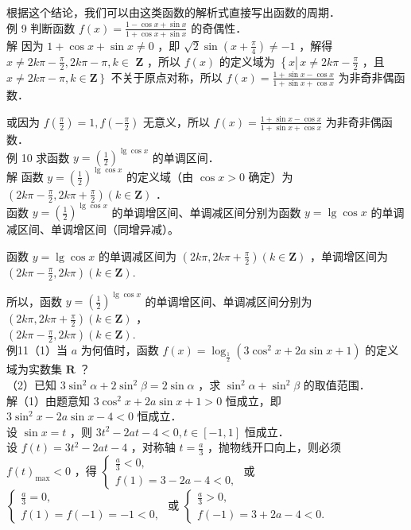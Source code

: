 \documentclass[10pt]{article}
\begin{document}
根据这个结论，我们可以由这类函数的解析式直接写出函数的周期．\\
例 9 判断函数 \(f(x)=\frac{1-\cos x+\sin x}{1+\cos x+\sin x}\) 的奇偶性．\\
解 因为 \(1+\cos x+\sin x \neq 0\) ，即 \(\sqrt{2} \sin \left(x+\frac{\pi}{4}\right) \neq-1\) ，解得 \(x \neq 2 k \pi-\frac{\pi}{2}, 2 k \pi-\pi, k \in\) \(\mathbf{Z}\) ，所以 \(f(x)\) 的定义域为 \(\left\{x \left\lvert\, x \neq 2 k \pi-\frac{\pi}{2}\right.\right.\) ，且 \(\left.x \neq 2 k \pi-\pi, k \in \mathbf{Z}\right\}\) 不关于原点对称，所以 \(f(x)=\frac{1+\sin x-\cos x}{1+\sin x+\cos x}\) 为非奇非偶函数．

或因为 \(f\left(\frac{\pi}{2}\right)=1, f\left(-\frac{\pi}{2}\right)\) 无意义，所以 \(f(x)=\frac{1+\sin x-\cos x}{1+\sin x+\cos x}\) 为非奇非偶函数．\\
例 10 求函数 \(y=\left(\frac{1}{2}\right)^{\lg \cos x}\) 的单调区间．\\
解 函数 \(y=\left(\frac{1}{2}\right)^{\lg \cos x}\) 的定义域（由 \(\cos x>0\) 确定）为 \(\left(2 k \pi-\frac{\pi}{2}, 2 k \pi+\frac{\pi}{2}\right)(k \in \mathbf{Z})\) ．\\
函数 \(y=\left(\frac{1}{2}\right)^{\lg \cos x}\) 的单调增区间、单调减区间分别为函数 \(y=\lg \cos x\) 的单调减区间、单调增区间（同增异减）。

函数 \(y=\lg \cos x\) 的单调减区间为 \(\left(2 k \pi, 2 k \pi+\frac{\pi}{2}\right)(k \in \mathbf{Z})\) ，单调增区间为 \(\left(2 k \pi-\frac{\pi}{2}, 2 k \pi\right)(k \in \mathbf{Z})\).

所以，函数 \(y=\left(\frac{1}{2}\right)^{\lg \cos x}\) 的单调增区间、单调减区间分别为 \(\left(2 k \pi, 2 k \pi+\frac{\pi}{2}\right)(k \in \mathbf{Z})\) ，\\
\(\left(2 k \pi-\frac{\pi}{2}, 2 k \pi\right)(k \in \mathbf{Z})\).\\
例11（1）当 \(a\) 为何值时，函数 \(f(x)=\log _{\frac{1}{2}}\left(3 \cos ^{2} x+2 a \sin x+1\right)\) 的定义域为实数集 \(\mathbf{R}\) ？\\
（2）已知 \(3 \sin ^{2} \alpha+2 \sin ^{2} \beta=2 \sin \alpha\) ，求 \(\sin ^{2} \alpha+\sin ^{2} \beta\) 的取值范围．\\
解（1）由题意知 \(3 \cos ^{2} x+2 a \sin x+1>0\) 恒成立，即 \(3 \sin ^{2} x-2 a \sin x-4<0\) 恒成立．\\
设 \(\sin x=t\) ，则 \(3 t^{2}-2 a t-4<0, t \in[-1,1]\) 恒成立．\\
设 \(f(t)=3 t^{2}-2 a t-4\) ，对称轴 \(t=\frac{a}{3}\) ，抛物线开口向上，则必须 \(f(t)_{\max }<0\) ，得 \(\left\{\begin{array}{l}\frac{a}{3}<0, \\ f(1)=3-2 a-4<0,\end{array}\right.\) 或 \(\left\{\begin{array}{l}\frac{a}{3}=0, \\ f(1)=f(-1)=-1<0,\end{array}\right.\) 或 \(\left\{\begin{array}{l}\frac{a}{3}>0, \\ f(-1)=3+2 a-4<0 .\end{array}\right.\)
\end{document}
